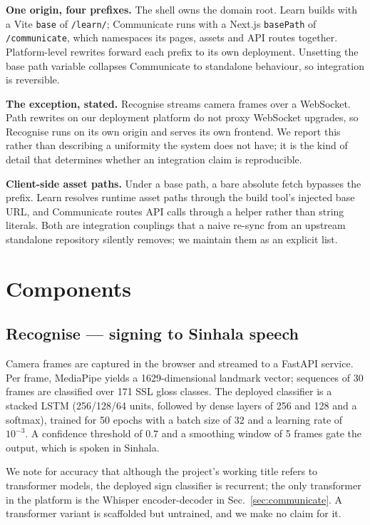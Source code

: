 \documentclass[conference]{IEEEtran}
\begin{document}
\textbf{One origin, four prefixes.} The shell owns the domain root. Learn
builds with a Vite \texttt{base} of \texttt{/learn/}; Communicate runs with a
Next.js \texttt{basePath} of \texttt{/communicate}, which namespaces its
pages, assets and API routes together. Platform-level rewrites forward each
prefix to its own deployment. Unsetting the base path variable collapses
Communicate to standalone behaviour, so integration is reversible.

\textbf{The exception, stated.} Recognise streams camera frames over a
WebSocket. Path rewrites on our deployment platform do not proxy WebSocket
upgrades, so Recognise runs on its own origin and serves its own frontend. We
report this rather than describing a uniformity the system does not have; it
is the kind of detail that determines whether an integration claim is
reproducible.

\textbf{Client-side asset paths.} Under a base path, a bare absolute fetch
bypasses the prefix. Learn resolves runtime asset paths through the build
tool's injected base URL, and Communicate routes API calls through a helper
rather than string literals. Both are integration couplings that a naive
re-sync from an upstream standalone repository silently removes; we maintain
them as an explicit list.

\section{Components}

\subsection{Recognise --- signing to Sinhala speech}
\label{sec:recognise}
Camera frames are captured in the browser and streamed to a FastAPI service.
Per frame, MediaPipe yields a 1629-dimensional landmark vector; sequences of
30 frames are classified over 171 SSL gloss classes. The deployed classifier
is a stacked LSTM (256/128/64 units, followed by dense layers of 256 and 128
and a softmax), trained for 50 epochs with a batch size of 32 and a learning
rate of $10^{-3}$. A confidence threshold of $0.7$ and a smoothing window of
5 frames gate the output, which is spoken in Sinhala.

We note for accuracy that although the project's working title refers to
transformer models, the deployed sign classifier is recurrent; the only
transformer in the platform is the Whisper encoder-decoder in
Sec.~\ref{sec:communicate}. A transformer variant is scaffolded but untrained,
and we make no claim for it.
\end{document}
